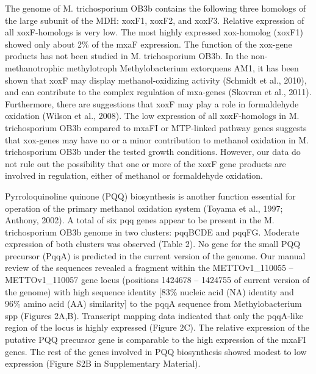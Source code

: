 The genome of M. trichosporium OB3b contains the following three homologs of the large subunit of the MDH: xoxF1, xoxF2, and xoxF3.
Relative expression of all xoxF-homologs is very low.
The most highly expressed xox-homolog (xoxF1) showed only about 2\% of the mxaF expression.
The function of the xox-gene products has not been studied in M. trichosporium OB3b.
In the non-methanotrophic methylotroph Methylobacterium extorquens AM1, it has been shown that xoxF may display methanol-oxidizing activity (Schmidt et al., 2010), and can contribute to the complex regulation of mxa-genes (Skovran et al., 2011).
Furthermore, there are suggestions that xoxF may play a role in formaldehyde oxidation (Wilson et al., 2008).
The low expression of all xoxF-homologs in M. trichosporium OB3b compared to mxaFI or MTP-linked pathway genes suggests that xox-genes may have no or a minor contribution to methanol oxidation in M. trichosporium OB3b under the tested growth conditions.
However, our data do not rule out the possibility that one or more of the xoxF gene products are involved in regulation, either of methanol or formaldehyde oxidation.

Pyrroloquinoline quinone (PQQ) biosynthesis is another function essential for operation of the primary methanol oxidation system (Toyama et al., 1997; Anthony, 2002).
A total of six pqq genes appear to be present in the M. trichosporium OB3b genome in two clusters: pqqBCDE and pqqFG.
Moderate expression of both clusters was observed (Table 2).
No gene for the small PQQ precursor (PqqA) is predicted in the current version of the genome.
Our manual review of the sequences revealed a fragment within the METTOv1\_110055 – METTOv1\_110057 gene locus (positions 1424678 – 1424755 of current version of the genome) with high sequence identity [83\% nucleic acid (NA) identity and 96\% amino acid (AA) similarity] to the pqqA sequence from Methylobacterium spp (Figures 2A,B).
Transcript mapping data indicated that only the pqqA-like region of the locus is highly expressed (Figure 2C).
The relative expression of the putative PQQ precursor gene is comparable to the high expression of the mxaFI genes.
The rest of the genes involved in PQQ biosynthesis showed modest to low expression (Figure S2B in Supplementary Material).


